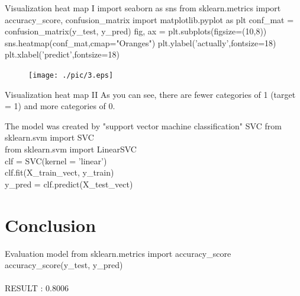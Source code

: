 \documentclass[
 size=14pt,
 paper=smartboard,  %
 mode=present, 		%
 display=slides, 	%
 style=tuliplab,  	%
 pauseslide,
 fleqn,leqno]{powerdot}
\begin{document}
\begin{slide}{Visualization heat map I}
import seaborn as sns 
from sklearn.metrics import accuracy\_score, confusion\_matrix 
import matplotlib.pyplot as plt 
conf\_mat = confusion\_matrix(y\_test, y\_pred) 
fig, ax = plt.subplots(figsize=(10,8)) 
sns.heatmap(conf\_mat,cmap="Oranges")  
plt.ylabel('actually',fontsize=18) 
plt.xlabel('predict',fontsize=18) 
\begin{center}
	\begin{figure}[htbp]
		\texttt{[image: ./pic/3.eps]}
	\end{figure}
\end{center}
	
\end{slide}
\begin{slide}{Visualization heat map II}
As you can see, there are fewer categories of 1 (target = 1) and more categories of 0. 
\end{slide}


\begin{slide}{The model was created by "support vector machine classification" SVC}
	from sklearn.svm import SVC\\
	from sklearn.svm import LinearSVC\\
	
	clf = SVC(kernel = 'linear')\\
	clf.fit(X\_train\_vect, y\_train)\\
	
	y\_pred = clf.predict(X\_test\_vect)\\
\end{slide}

\section{Conclusion}

\begin{slide}[toc=,bm=]{Evaluation model}
from sklearn.metrics import accuracy\_score\\
accuracy\_score(y\_test, y\_pred)\\
\\
RESULT : 0.8006\\
	
\end{slide}



\end{document}
